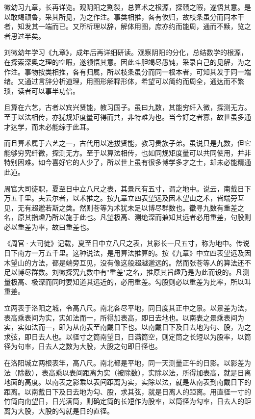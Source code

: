 \documentclass[10pt,a4paper]{article}
\newlength{\lw}
\newlength{\rw}
\newcommand{\biling}[2]{%
  \par\vspace{0.2em}%
  \noindent%
  \colorbox{classicalbg}{\parbox{\dimexpr\lw-2\fboxsep\relax}{#1}}%
  \hfill%
  \colorbox{modernbg}{\parbox{\dimexpr\rw-2\fboxsep\relax}{#2}}%
  \vspace{0.2em}%
}
\newcommand{\sk}{\vspace{0.1em}}
\begin{document}
\sk

\biling{
徽幼习九章，长再详览。观阴阳之割裂，总算术之根源，探赜之暇，遂悟其意。是以敢竭顽鲁，采其所见，为之作注。事类相推，各有攸归，故枝条虽分而同本干者，知发其一端而已。又所析理以辞，解体用图，庶亦约而能周，通而不黩，览之者思过半矣。
}{
刘徽幼年学习《九章》，成年后再详细研读。观察阴阳的分化，总结数学的根源，在探索深奥之理的空暇，遂领悟其意。因此斗胆竭尽愚钝，采录自己的见解，为之作注。事物按类相推，各有归属，所以枝条虽分而同一根本者，可知其发于同一端绪。又通过言辞分析道理，用图形解释形体，希望可以简约而周全，通达而不繁琐，读者可以事半功倍。
}

\sk

\biling{
且算在六艺，古者以宾兴贤能，教习国子。虽曰九数，其能穷纤入微，探测无方。至于以法相传，亦犹规矩度量可得而共，非特难为也。当今好之者寡，故世虽多通才达学，而未必能综于此耳。
}{
而且算术属于六艺之一，古代用以选拔贤能，教习贵族子弟。虽说只是九数，但它能够穷究纤微，探测无方。至于以算法相传，也如同规矩度量可以共同使用，并非特别困难。如今喜好它的人少了，所以世上虽有很多博学多才之士，却未必能精通此道。
}

\sk

\biling{
周官大司徒职，夏至日中立八尺之表，其景尺有五寸，谓之地中。说云，南戴日下万五千里。夫云尔者，以术推之。按九章立四表望远及因木望山之术，皆端旁互见，无有超邈若斯之类。然则苍等为术犹未足以博尽群数也。徽寻九数有重差之名，原其指趣乃所以施于此也。凡望极高、测绝深而兼知其远者必用重差，句股则必以重差为率，故曰重差也。
}{
《周官·大司徒》记载，夏至日中立八尺之表，其影长一尺五寸，称为地中。传说日下南方一万五千里。这种说法，是用算法推算的。按《九章》中立四表望远及因木望山的方法，都是端旁互见，没有像这般超越邈远的。然而张苍等人的算法还不足以博尽群数。刘徽探究九数中有"重差"之名，推原其旨趣乃是为此而设的。凡测量极高、极深而同时要知道其远近的，必用重差。勾股则必以重差为比率，所以叫重差。
}

\sk

\biling{
立两表于洛阳之城，令高八尺。南北各尽平地，同日度其正中之景。以景差为法，表高乘表间为实，实如法而一，所得加表高，即日去地也。以南表之景乘表间为实，实如法而一，即为从南表至南戴日下也。以南戴日下及日去地为句、股，为之求弦，即日去人也。以径寸之筒南望日，日满筒空，则定筒之长短以为股率，以筒径为句率，日去人之数为大股，大股之句即日径也。
}{
在洛阳城立两根表竿，高八尺。南北都是平地，同一天测量正午的日影。以影差为法（除数），表高乘以表间距离为实（被除数），实除以法，所得加表高，就是日离地面的高度。以南表之影乘以表间距离为实，实除以法，就是从南表到南戴日下的距离。以南戴日下及日去地为勾、股，求其弦，就是日离人的距离。用直径一寸的竹筒向南望日，日光满筒，则确定筒的长短作为股率，以筒径为勾率，日去人的距离为大股，大股的勾就是日的直径。
}
\end{document}
